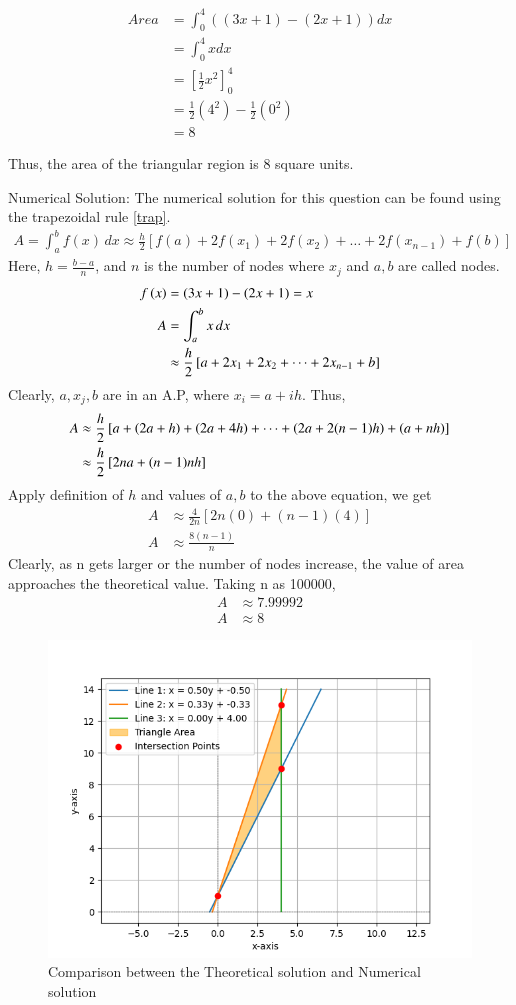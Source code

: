 \documentclass[journal]{IEEEtran}
\begin{document}
	\begin{align}
	Area &= \int_0^4 ((3x+1) - (2x+1)) dx \\ &=\int_0^4 x dx \\&= \left[ \frac{1}{2}x^2 \right]_0^4 \\&= \frac{1}{2}(4^2) - \frac{1}{2}(0^2) \\&= 8
	\end{align}
	
	Thus, the area of the triangular region is 8 square units.

	Numerical Solution:\newline
	The numerical solution for this question can be found using the trapezoidal rule \eqref{trap}.
	\begin{align}
		A  = \int_a^b f(x) \, dx \approx \frac{h}{2} \left[ f(a) + 2f(x_1) + 2f(x_2) + \dots + 2f(x_{n-1}) + f(b) \right]
		\label{trap}
	\end{align}
	Here, $h = \frac{b-a}{n}$, and $n$ is the number of nodes where $x_j$ and $a,b$ are called nodes.
	\begin{align}
		f\left(x\right) &= (3x+1) - (2x+1) = x\\
		A &= \int_a^b x \, dx \\ &\approx \frac{h}{2} \left[ a + 2x_1 + 2x_2 + \dots + 2x_{n-1} + b \right]
	\end{align}
	Clearly, $a, x_j, b $ are in an A.P, where $x_i = a+ih$. Thus,
	\begin{align}
		A &\approx \frac{h}{2} \left[ a + \left(2a+ h\right) + \left(2a + 4h\right) + \dots + \left(2a + 2(n-1)h\right) + \left(a + nh\right) \right] \\
		&\approx \frac{h}{2} \left[ 2na + (n-1)nh \right]
	\end{align}
	Apply definition of $h$ and values of $a,b$ to the above equation, we get
	\begin{align}
		A &\approx \frac{4}{2n} \left[ 2n(0) + (n-1)(4) \right]\\
		A&\approx \frac{8(n-1)}{n}
	\end{align} 
	Clearly, as n gets larger or the number of nodes increase, the value of area approaches the theoretical value. Taking n as 100000,
			\begin{align}
				A &\approx 7.99992 \\ A &\approx 8
			\end{align} 
	\begin{figure}[h!]
		\centering
		\includegraphics[width=\columnwidth]{figs/fig1.png}
		\caption{Comparison between the Theoretical solution and Numerical solution}
		\label{stemplot}
	\end{figure}
\end{document}
